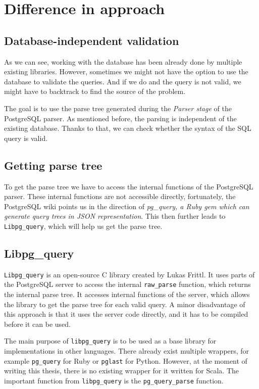 \section{Difference in approach}
\subsection{Database-independent validation}
As we can see, working with the database has been already done by multiple existing libraries. However, sometimes we might not have the option to use the database to validate the queries. And if we do and the query is not valid, we might have to backtrack to find the source of the problem. 

The goal is to use the parse tree generated during the \textit{Parser stage} of the PostgreSQL parser. As mentioned before, the parsing is independent of the existing database. Thanks to that, we can check whether the syntax of the SQL query is valid. 

\subsection{Getting parse tree}
To get the parse tree we have to access the internal functions of the PostgreSQL parser. These internal functions are not accessible directly, fortunately, the PostgreSQL\cite{Postgres wiki} wiki points us in the direction of \textit{pg\_query, a Ruby gem which can generate query trees in JSON representation}. This then further leads to \texttt{Libpg\_query}, which will help us get the parse tree.

\subsection{Libpg\_query}
\texttt{Libpg\_query} is an open-source C library created by Lukas Frittl. It uses parts of the PostgreSQL server to access the internal \texttt{raw\_parse} function, which returns the internal parse tree. It accesses internal functions of the server, which allows the library to get the parse tree for each valid query. A minor disadvantage of this approach is that it uses the server code directly, and it has to be compiled before it can be used.

The main purpose of \texttt{libpg\_query} is to be used as a base library for implementations in other languages. There already exist multiple wrappers, for example \texttt{pg\_query} for Ruby or \texttt{pglast} for Python. However, at the moment of writing this thesis, there is no existing wrapper for it written for Scala. The important function from \texttt{libpg\_query} is the \texttt{pg\_query\_parse} function.

